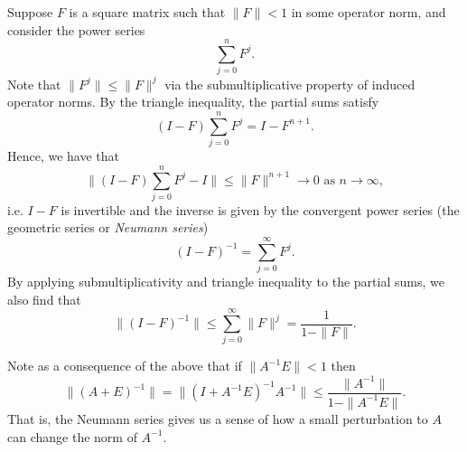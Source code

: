 \documentclass[12pt, leqno]{article}
\begin{document}
Suppose $F$ is a square matrix such that $\|F\| < 1$ in
some operator norm, and consider the power series
\[
  \sum_{j=0}^n F^j.
\]
Note that $\|F^j\| \leq \|F\|^j$ via the submultiplicative property
of induced operator norms.
By the triangle inequality, the partial sums satisfy
\[
  (I-F) \sum_{j=0}^n F^j = I - F^{n+1}.
\]
Hence, we have that
\[
  \|(I-F) \sum_{j=0}^n F^j - I\| \leq \|F\|^{n+1} \rightarrow 0
  \mbox{ as } n \rightarrow \infty,
\]
i.e. $I-F$ is invertible and the inverse is given by the convergent
power series (the geometric series or {\em Neumann series})
\[
  (I-F)^{-1} = \sum_{j=0}^\infty F^j.
\]
By applying submultiplicativity and triangle inequality to the partial
sums, we also find that
\[
  \|(I-F)^{-1}\| \leq \sum_{j=0}^\infty \|F\|^j = \frac{1}{1-\|F\|}.
\]
  
Note as a consequence of the above that if $\|A^{-1} E\| < 1$ then
\[
  \|(A+E)^{-1}\|
  = \|(I+A^{-1} E)^{-1} A^{-1}\|
  \leq \frac{\|A^{-1}\|}{1-\|A^{-1} E\|}. 
\]
That is, the Neumann series gives us a sense of how a small
perturbation to $A$ can change the norm of $A^{-1}$.



\end{document}
